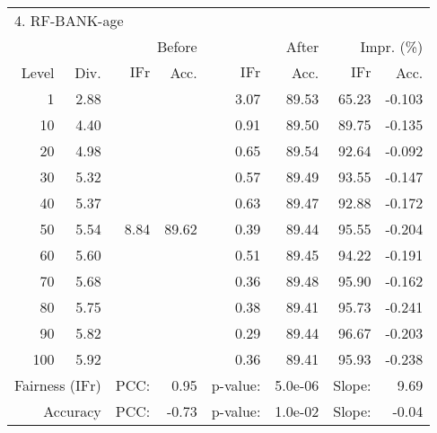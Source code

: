 \begin{tabular}{rr||rr|rr|rr}
\multicolumn{4}{l}{4. RF-BANK-age} & \multicolumn{2}{c}{} & \multicolumn{2}{c}{}\\
 &  & \multicolumn{2}{r|}{Before} & \multicolumn{2}{r|}{After} & \multicolumn{2}{r}{Impr. (\%)}\\
Level & Div. & $\mathrm{IFr}$ & Acc. & $\mathrm{IFr}$ & Acc. & $\mathrm{IFr}$ & Acc.\\
\hline
1 & 2.88 & \multirow{11}{*}{8.84} & \multirow{11}{*}{89.62} & 3.07 & 89.53 & 65.23 & -0.103\\
10 & 4.40 &  &  & 0.91 & 89.50 & 89.75 & -0.135\\
20 & 4.98 &  &  & 0.65 & 89.54 & 92.64 & -0.092\\
30 & 5.32 &  &  & 0.57 & 89.49 & 93.55 & -0.147\\
40 & 5.37 &  &  & 0.63 & 89.47 & 92.88 & -0.172\\
50 & 5.54 &  &  & 0.39 & 89.44 & 95.55 & -0.204\\
60 & 5.60 &  &  & 0.51 & 89.45 & 94.22 & -0.191\\
70 & 5.68 &  &  & 0.36 & 89.48 & 95.90 & -0.162\\
80 & 5.75 &  &  & 0.38 & 89.41 & 95.73 & -0.241\\
90 & 5.82 &  &  & 0.29 & 89.44 & 96.67 & -0.203\\
100 & 5.92 &  &  & 0.36 & 89.41 & 95.93 & -0.238\\
\hline
\multicolumn{2}{r}{Fairness ($\mathrm{IFr}$)} & PCC: & \multicolumn{1}{r}{0.95} & p-value:  & \multicolumn{1}{r}{5.0e-06} & Slope:  & 9.69\\
\multicolumn{2}{r}{Accuracy} & PCC: & \multicolumn{1}{r}{-0.73} & p-value:  & \multicolumn{1}{r}{1.0e-02} & Slope:  & -0.04\\
\end{tabular}